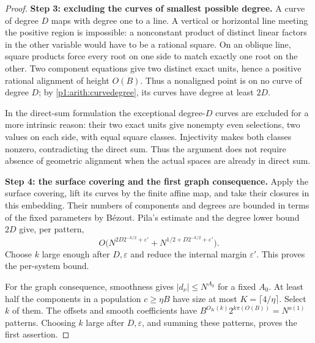 \begin{proof}
\medskip\noindent
\textbf{Step 3: excluding the curves of smallest possible degree.}
A curve of degree $D$ maps with degree one to a line.  A vertical or
horizontal line meeting the positive region is impossible: a nonconstant
product of distinct linear factors in the other variable would have to be
a rational square.  On an oblique line, square products force every root
on one side to match exactly one root on the other.  Two component
equations give two distinct exact units, hence a positive rational
alignment of height $O(B)$.  Thus a nonaligned point is on no curve of
degree $D$; by \eqref{p1:arith:curvedegree}, its curves have degree at least
$2D$.

In the direct-sum formulation the
exceptional degree-$D$ curves are excluded for a more intrinsic reason:
their two exact units give nonempty even selections, two values on each
side, with equal square classes.  Injectivity makes both classes nonzero,
contradicting the direct sum.  Thus the argument does not require absence
of geometric alignment when the actual spaces are already in direct sum.

\medskip\noindent
\textbf{Step 4: the surface covering and the first graph consequence.}
Apply the surface covering, lift its curves by the finite affine map, and
take their closures in this embedding.  Their numbers of components and
degrees are bounded in terms of the fixed parameters by B\'ezout.
Pila's estimate and the degree lower bound $2D$ give, per pattern,
\[
 O\big(N^{2D2^{-k/2}+\varepsilon'}
        +N^{1/2+D2^{-k/2}+\varepsilon'}\big).
\]
Choose $k$ large enough after $D,\varepsilon$ and reduce the internal
margin $\varepsilon'$.  This proves the per-system bound.

For the graph consequence, smoothness gives $|d_\nu|\leq N^{A_0}$ for a
fixed $A_0$.  At least half the components in a population $c\geq\eta B$ have size
at most $K=\lceil4/\eta\rceil$.  Select $k$ of them.
The offsets and smooth coefficients have
$B^{O_K(k)}2^{k\pi(O(B))}=N^{o(1)}$ patterns.  Choosing $k$ large after
$D,\varepsilon$, and summing these patterns, proves the first assertion.


\end{proof}
